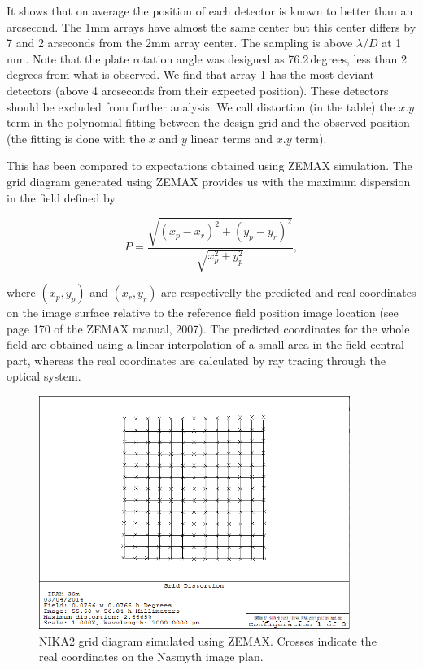 It shows that on average the position of each detector is known to better than
an arcsecond. The 1mm arrays have almost the same center but this center
differs by 7 and 2 arseconds from the 2mm array center. The sampling is above
$\lambda/D$ at 1 mm. Note that the plate rotation angle was designed as
76.2\,degrees, less than 2 degrees from what is observed. We find that array 1
has the most deviant detectors (above 4 arcseconds from their expected
position). These detectors should be excluded from further analysis. We call
distortion (in the table) the $x.y$ term in the polynomial fitting between the
design grid and the observed position (the fitting is done with the $x$ and
$y$ linear terms and $x.y$ term). 



This has been compared to expectations obtained using ZEMAX
simulation. The grid diagram generated using ZEMAX provides us with
the maximum dispersion in the field defined by

\begin{equation}
P = \frac{\sqrt{(x_p - x_r)^2 + (y_p - y_r)^2}}{\sqrt{x_p^2 + y_p^2}},
\end{equation}

where $(x_p, y_p)$ and $(x_r, y_r)$ are respectivelly the predicted
and real coordinates on the image surface relative to the reference
field position image location (see page 170 of the ZEMAX manual, 2007).
The predicted coordinates for the whole field are obtained using a
linear interpolation of a small area in the field central part,
whereas the real coordinates are calculated by ray tracing through the
optical system.

\begin{figure}[ht] 
\begin{center}
\includegraphics[width=0.9\textwidth]{Figures/NIKA2_Final_grid.png}
\caption[Simulated FOV grid]{NIKA2 grid diagram simulated using ZEMAX. Crosses indicate
  the real coordinates on the Nasmyth image plan. }
 \label{fig:fov_grid_distortion_zemax}
\end{center}
\end{figure}

